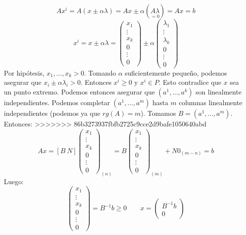 \documentclass[PM.tex]{subfiles}
\begin{document}
\begin{dem}
\[ Ax^i = A(x \pm αλ) = Ax \pm α(\underset{=0}{Aλ}) = Ax = b \]
\[ x^i = x \pm αλ = \begin{pmatrix}x_1\\\vdots\\x_k\\0\\\vdots\\0\end{pmatrix} \pm α \begin{pmatrix}λ_1\\\vdots\\λ_k\\0\\\vdots\\0\end{pmatrix} \]
Por hipótesis, $x_1,\dots,x_k > 0$. Tomando $α$ suficientemente pequeño, podemos asegurar que $x_i \pm αλ_i > 0$. Entonces $x^i \geq 0$ y $x^i \in P$. Esto contradice que $x$ sea un punto extremo. Podemos entonces asegurar que $(a^1,\dots,a^k)$ son linealmente independientes. Podemos completar $(a^1,\dots,a^m)$ hasta $m$ columnas linealmente independientes (podemos ya que $rg(A) = m$). Tomamos $B = (a^1,\dots,a^m)$. Entonces:
>>>>>>> 86b3273937fbfb2725c9cce2d9bafe1050640abd
\[ Ax =[B\ N]\begin{pmatrix}x_1\\\vdots\\x_k\\0\\\vdots\\0\end{pmatrix}_{(n)} = B \begin{pmatrix}x_1\\\vdots\\x_k\\0\\\vdots\\0\end{pmatrix}_{(m)} +N0_{(m-n)} = b \]
Luego: \[ \begin{pmatrix}x_1\\\vdots\\x_k\\0\\\vdots\\0\end{pmatrix} = B^{-1}b \geq 0 \qquad x = \begin{pmatrix}B^{-1}b\\0\end{pmatrix} \]
\end{dem}
\end{document}
